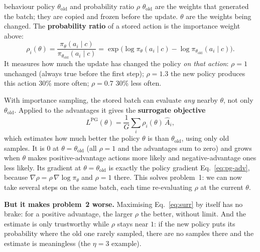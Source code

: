 \documentclass[11pt,a4paper]{article}
\newcommand{\Ah}{\hat A}
\begin{document}
\begin{newc}{behaviour policy $\theta_{\mathrm{old}}$ and probability ratio $\rho$}
$\theta_{\mathrm{old}}$ are the weights that generated the batch; they are copied and frozen before the update. $\theta$ are the weights being changed. The \textbf{probability ratio} of a stored action is the importance weight above:
\[\rho_i(\theta)=\frac{\pi_\theta(a_i\mid c)}{\pi_{\theta_{\mathrm{old}}}(a_i\mid c)}=\exp\big(\log\pi_\theta(a_i\mid c)-\log\pi_{\theta_{\mathrm{old}}}(a_i\mid c)\big).\]
It measures how much the update has changed the policy \emph{on that action}: $\rho=1$ unchanged (always true before the first step); $\rho=1.3$ the new policy produces this action 30\% more often; $\rho=0.7$ 30\% less often.
\end{newc}

With importance sampling, the stored batch can evaluate \emph{any} nearby $\theta$, not only $\theta_{\mathrm{old}}$. Applied to the advantages it gives the \textbf{surrogate objective}
\begin{equation}
L^{\mathrm{PG}}(\theta)=\frac1G\sum_i\rho_i(\theta)\,\Ah_i ,
\label{eq:surr}
\end{equation}
which estimates how much better the policy $\theta$ is than $\theta_{\mathrm{old}}$, using only old samples. It is $0$ at $\theta=\theta_{\mathrm{old}}$ (all $\rho=1$ and the advantages sum to zero) and grows when $\theta$ makes positive-advantage actions more likely and negative-advantage ones less likely. Its gradient at $\theta=\theta_{\mathrm{old}}$ is exactly the policy gradient Eq.~\eqref{eq:pg-adv}, because $\nabla\rho=\rho\,\nabla\log\pi_\theta$ and $\rho=1$ there. This solves problem~1: we can now take several steps on the same batch, each time re-evaluating $\rho$ at the current $\theta$.

\textbf{But it makes problem~2 worse.} Maximising Eq.~\eqref{eq:surr} by itself has no brake: for a positive advantage, the larger $\rho$ the better, without limit. And the estimate is only trustworthy while $\rho$ stays near $1$: if the new policy puts its probability where the old one rarely sampled, there are no samples there and the estimate is meaningless (the $\eta=3$ example).
\end{document}
